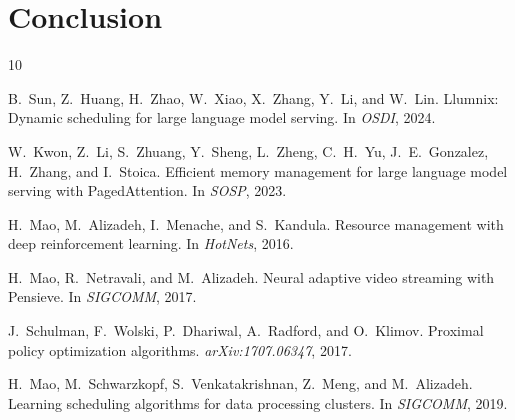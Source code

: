 \documentclass{article}
\begin{document}

\section{Conclusion}


\begin{thebibliography}{10}
\small

B.~Sun, Z.~Huang, H.~Zhao, W.~Xiao, X.~Zhang, Y.~Li, and W.~Lin.
Llumnix: Dynamic scheduling for large language model serving.
In \emph{OSDI}, 2024.

W.~Kwon, Z.~Li, S.~Zhuang, Y.~Sheng, L.~Zheng, C.~H.~Yu, J.~E.~Gonzalez, H.~Zhang, and I.~Stoica.
Efficient memory management for large language model serving with {PagedAttention}.
In \emph{SOSP}, 2023.

H.~Mao, M.~Alizadeh, I.~Menache, and S.~Kandula.
Resource management with deep reinforcement learning.
In \emph{HotNets}, 2016.

H.~Mao, R.~Netravali, and M.~Alizadeh.
Neural adaptive video streaming with {Pensieve}.
In \emph{SIGCOMM}, 2017.

J.~Schulman, F.~Wolski, P.~Dhariwal, A.~Radford, and O.~Klimov.
Proximal policy optimization algorithms.
\emph{arXiv:1707.06347}, 2017.

H.~Mao, M.~Schwarzkopf, S.~Venkatakrishnan, Z.~Meng, and M.~Alizadeh.
Learning scheduling algorithms for data processing clusters.
In \emph{SIGCOMM}, 2019.


\end{thebibliography}
\end{document}
